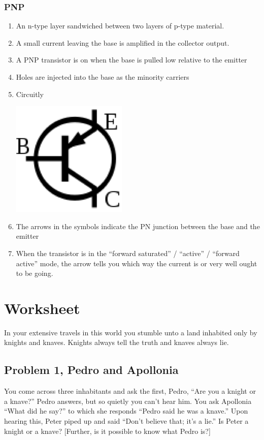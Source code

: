 \documentclass[11pt]{book}
\begin{document}
\subsubsection{PNP}
\begin{enumerate}
	\item An n-type layer sandwiched between two layers of p-type material.
	\item A small current leaving the base is amplified in the collector output.
	\item A PNP transistor is on when the base is pulled low relative to the emitter
	\item Holes are injected into the base as the minority carriers
	\item Circuitly
	\begin{center}
		\includegraphics{figures/20.21.png}
	\end{center}
	\item The arrows in the symbols indicate the PN junction between the base and the emitter
	\item When the transistor is in the ``forward saturated'' / ``active'' / ``forward active'' mode, the arrow tells you which way the current is or very well ought to be going.
\end{enumerate}


\newpage
\section{Worksheet}
In your extensive travels in this world you stumble unto a land inhabited only by knights and knaves. Knights always tell the truth and knaves always lie.
\subsection{Problem 1, Pedro and Apollonia}
You come across three inhabitants and ask the first, Pedro, “Are you a knight or a knave?” Pedro answers, but so quietly you can’t hear him. You ask Apollonia “What did he say?” to which she responds “Pedro said he was a knave.” Upon hearing this, Peter piped up and said “Don’t believe that; it’s a lie.” Is Peter a knight or a knave? [Further, is it possible to know what Pedro is?]
\end{document}
